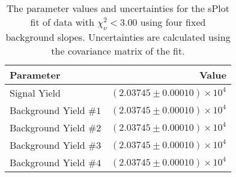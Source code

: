
\begin{table}[ht]
    \begin{center}
        \begin{tabular}{lr}\toprule
            Parameter & Value \\\midrule
            Signal Yield & $(2.03745 \pm 0.00010) \times 10^{4}$ \\
            Background Yield $\#1$ & $(2.03745 \pm 0.00010) \times 10^{4}$ \\
            Background Yield $\#2$ & $(2.03745 \pm 0.00010) \times 10^{4}$ \\
            Background Yield $\#3$ & $(2.03745 \pm 0.00010) \times 10^{4}$ \\
            Background Yield $\#4$ & $(2.03745 \pm 0.00010) \times 10^{4}$ \\\bottomrule
        \end{tabular}
        \caption{The parameter values and uncertainties for the sPlot fit of data with $\chi^2_\nu < 3.00$ using four fixed background slopes. Uncertainties are calculated using the covariance matrix of the fit.}\label{tab:splot-fit-results-chisqdof-3.00-fixed-4}
    \end{center}
\end{table}
